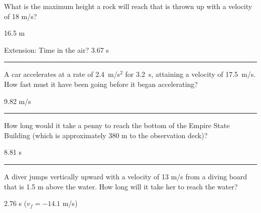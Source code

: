 \documentclass[12pt]{exam}
\begin{document}
\Large

\def\mystrut{\protect\rule[-2.2ex]{0ex}{2.2ex}} 
\qformat{ \textbf{Task \#\thequestion}
  \ifthenelse{\equal{\thequestion}{\thequestiontitle}}
    {}
    {: \emph{\thequestiontitle}}
  \mystrut  \hfill}


\begin{questions}


\question
  What is the maximum height a rock will reach that is thrown up with a velocity of 18 m/s? 

  \begin{solution}
    16.5 m

    Extension: Time in the air?  3.67 s
  \end{solution}


\vs \hrule \vs

\question
  A car accelerates at a rate of 2.4~m/s$^2$ for 3.2~s, attaining a velocity of 17.5~m/s.  How fast must it have been going before it began accelerating?

  \begin{solution}
      9.82 m/s
  \end{solution}

\vs
\ifprintanswers
  \hrule \vs
\else
  \pagebreak

\fi


\question
  How long would it take a penny to reach the bottom of the Empire State Building (which is approximately 380 m to the observation deck)?

  \begin{solution}
    8.81 s
  \end{solution}

\vs \hrule \vs

\question
  A diver jumps vertically upward with a velocity of 13 m/s from a diving board that is 1.5 m above the water.  How long will it take her to reach the water? 

  \begin{solution}
    2.76 s ($v_f=-14.1$ m/s)
  \end{solution}

  \vs


\end{questions}
\end{document}
